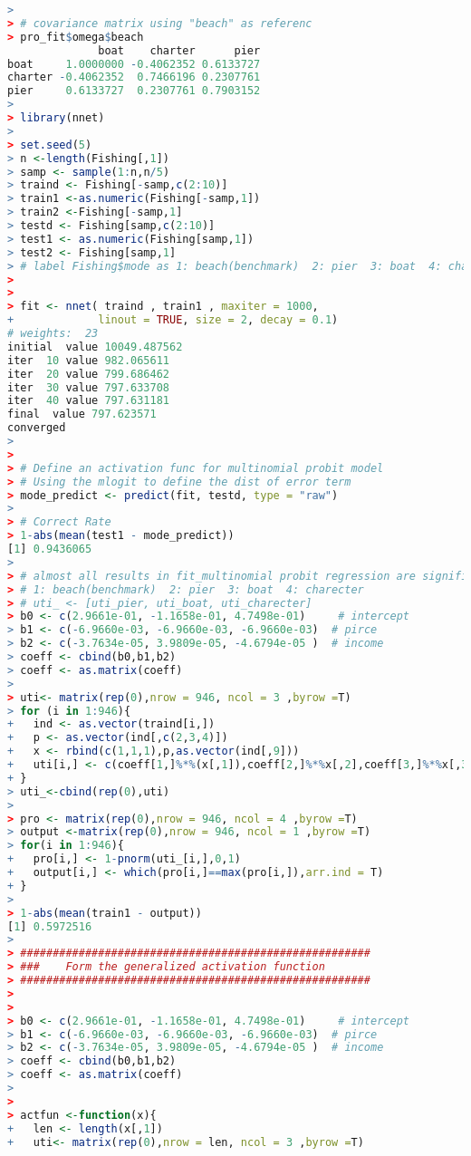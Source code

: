 \documentclass[cn]{elegantpaper}
\begin{document}
{\begin{lstlisting}[language=R]
> 
> # covariance matrix using "beach" as referenc
> pro_fit$omega$beach
              boat    charter      pier
boat     1.0000000 -0.4062352 0.6133727
charter -0.4062352  0.7466196 0.2307761
pier     0.6133727  0.2307761 0.7903152
> 
> library(nnet)
> 
> set.seed(5)
> n <-length(Fishing[,1])
> samp <- sample(1:n,n/5)
> traind <- Fishing[-samp,c(2:10)]
> train1 <-as.numeric(Fishing[-samp,1])
> train2 <-Fishing[-samp,1]
> testd <- Fishing[samp,c(2:10)]
> test1 <- as.numeric(Fishing[samp,1])
> test2 <- Fishing[samp,1]
> # label Fishing$mode as 1: beach(benchmark)  2: pier  3: boat  4: charecter
> 
> 
> fit <- nnet( traind , train1 , maxiter = 1000,
+             linout = TRUE, size = 2, decay = 0.1)
# weights:  23
initial  value 10049.487562 
iter  10 value 982.065611
iter  20 value 799.686462
iter  30 value 797.633708
iter  40 value 797.631181
final  value 797.623571 
converged
> 
> 
> # Define an activation func for multinomial probit model
> # Using the mlogit to define the dist of error term
> mode_predict <- predict(fit, testd, type = "raw")
> 
> # Correct Rate
> 1-abs(mean(test1 - mode_predict))
[1] 0.9436065
> 
> # almost all results in fit_multinomial probit regression are significant
> # 1: beach(benchmark)  2: pier  3: boat  4: charecter
> # uti_ <- [uti_pier, uti_boat, uti_charecter]
> b0 <- c(2.9661e-01, -1.1658e-01, 4.7498e-01)     # intercept
> b1 <- c(-6.9660e-03, -6.9660e-03, -6.9660e-03)  # pirce
> b2 <- c(-3.7634e-05, 3.9809e-05, -4.6794e-05 )  # income 
> coeff <- cbind(b0,b1,b2)
> coeff <- as.matrix(coeff)
> 
> uti<- matrix(rep(0),nrow = 946, ncol = 3 ,byrow =T)
> for (i in 1:946){
+   ind <- as.vector(traind[i,])
+   p <- as.vector(ind[,c(2,3,4)])
+   x <- rbind(c(1,1,1),p,as.vector(ind[,9]))
+   uti[i,] <- c(coeff[1,]%*%(x[,1]),coeff[2,]%*%x[,2],coeff[3,]%*%x[,3]) 
+ }
> uti_<-cbind(rep(0),uti)
> 
> pro <- matrix(rep(0),nrow = 946, ncol = 4 ,byrow =T)
> output <-matrix(rep(0),nrow = 946, ncol = 1 ,byrow =T)
> for(i in 1:946){
+   pro[i,] <- 1-pnorm(uti_[i,],0,1)
+   output[i,] <- which(pro[i,]==max(pro[i,]),arr.ind = T)
+ }
> 
> 1-abs(mean(train1 - output))
[1] 0.5972516
> 
> ######################################################
> ###    Form the generalized activation function 
> ######################################################
> 
> 
> b0 <- c(2.9661e-01, -1.1658e-01, 4.7498e-01)     # intercept
> b1 <- c(-6.9660e-03, -6.9660e-03, -6.9660e-03)  # pirce
> b2 <- c(-3.7634e-05, 3.9809e-05, -4.6794e-05 )  # income 
> coeff <- cbind(b0,b1,b2)
> coeff <- as.matrix(coeff)
> 
> 
> actfun <-function(x){
+   len <- length(x[,1])
+   uti<- matrix(rep(0),nrow = len, ncol = 3 ,byrow =T)

\end{lstlisting}}
\end{document}
